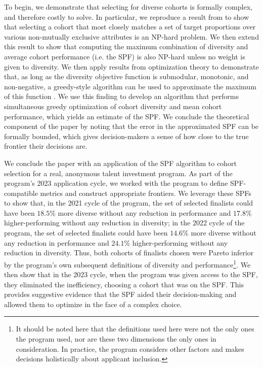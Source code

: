 To begin, we demonstrate that selecting for diverse cohorts is formally complex, and therefore costly to solve. In particular, we reproduce a result from \textcite{huppenkothen2020entrofy} to show that selecting a cohort that most closely matches a set of target proportions over various non-mutually exclusive attributes is an NP-hard problem. We then extend this result to show that computing the maximum combination of diversity and average cohort performance (i.e. the SPF) is also NP-hard unless no weight is given to diversity. We then apply results from optimization theory to demonstrate that, as long as the diversity objective function is submodular, monotonic, and non-negative, a greedy-style algorithm can be used to approximate the maximum of this function \cite{huppenkothen2020entrofy}. We use this finding to develop an algorithm that performs simultaneous greedy optimization of cohort diversity and mean cohort performance, which yields an estimate of the SPF. We conclude the theoretical component of the paper by noting that the error in the approximated SPF can be formally bounded, which gives decision-makers a sense of how close to the true frontier their decisions are. 

We conclude the paper with an application of the SPF algorithm to cohort selection for a real, anonymous talent investment program. As part of the program's 2023 application cycle, we worked with the program to define SPF-compatible metrics and construct appropriate frontiers. We leverage these SPFs to show that, in the 2021 cycle of the program, the set of selected finalists could have been $18.5\%$ more diverse without any reduction in performance and $17.8\%$ higher-performing without any reduction in diversity; in the 2022 cycle of the program, the set of selected finalists could have been $14.6\%$ more diverse without any reduction in performance and $24.1\%$ higher-performing without any reduction in diversity. Thus, both cohorts of finalists chosen were Pareto inferior by the program's own subsequent definitions of diversity and performance\footnote{It should be noted here that the definitions used here were not the only ones the program used, nor are these two dimensions the only ones in consideration. In practice, the program considers other factors and makes decisions holistically about applicant inclusion.}. We then show that in the 2023 cycle, when the program was given access to the SPF, they eliminated the inefficiency, choosing a cohort that was on the SPF. This provides suggestive evidence that the SPF aided their decision-making and allowed them to optimize in the face of a complex choice.

